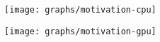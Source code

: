 \begin{figure*}[htbp]
   \texttt{[image: graphs/motivation-cpu]}
   \label{fig:template}
\end{figure*}
\begin{figure*}[htbp]
   \texttt{[image: graphs/motivation-gpu]}
   \label{fig:template}
\end{figure*}
